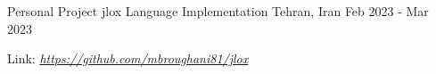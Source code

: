 

\begin{cventries}


  \cventry
  {Personal Project} %
  {jlox Language Implementation} %
  {Tehran, Iran} %
  {Feb 2023 - Mar 2023} %
  {
    \begin{cvitems} %
    \item {Link: \href{https://github.com/mbroughani81/jlox}{\textit{https://github.com/mbroughani81/jlox}}}
    \end{cvitems}
  }


\end{cventries}
